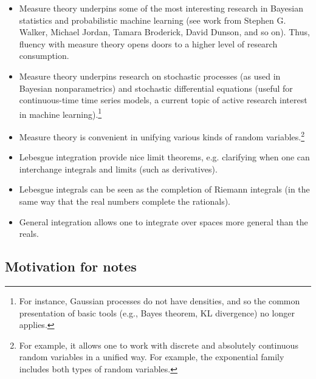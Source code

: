 \documentclass{article} %
\begin{document}
\begin{itemize}
\item Measure theory underpins some of the most interesting research in Bayesian statistics and probabilistic machine learning (see work from Stephen G. Walker, Michael Jordan, Tamara Broderick, David Dunson, and so on).   Thus, fluency with measure theory opens doors to a higher level of research consumption. 
\item Measure theory underpins research on stochastic processes (as used in Bayesian nonparametrics) and stochastic differential equations (useful for continuous-time time series models, a current topic of active research interest in machine learning).\footnote{For instance, Gaussian processes do not have densities, and so the common presentation of basic tools (e.g., Bayes theorem, KL divergence) no longer applies.} 
\item Measure theory is convenient in unifying various kinds of random variables.\footnote{For example, it allows one to work with discrete and absolutely continuous random variables in a unified way.  For example, the exponential family includes both types of random variables.}
\item Lebesgue integration provide nice limit theorems, e.g. clarifying when one can interchange integrals and limits (such as derivatives).   
\item Lebesgue integrals can be seen as the completion of Riemann integrals (in the same way that the real numbers complete the rationals).
\item General integration allows one to integrate over spaces more general than the reals. 

\end{itemize}



\subsection{Motivation for notes}
\end{document}
